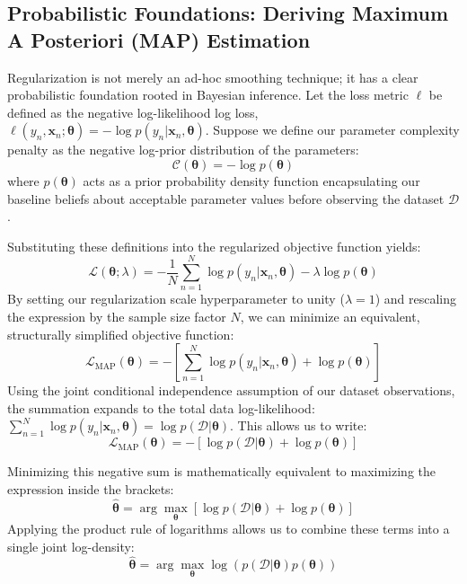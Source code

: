 \documentclass{article}
\begin{document}
\subsection{Probabilistic Foundations: Deriving Maximum A Posteriori (MAP) Estimation}

Regularization is not merely an ad-hoc smoothing technique; it has a clear probabilistic foundation rooted in Bayesian inference. Let the loss metric $\ell$ be defined as the negative log-likelihood log loss, $\ell(y_n, \mathbf{x}_n; \boldsymbol{\theta}) = -\log p(y_n | \mathbf{x}_n, \boldsymbol{\theta})$. Suppose we define our parameter complexity penalty as the negative log-prior distribution of the parameters:
\begin{equation}
\mathcal{C}(\boldsymbol{\theta}) = -\log p(\boldsymbol{\theta})
\end{equation}
where $p(\boldsymbol{\theta})$ acts as a prior probability density function encapsulating our baseline beliefs about acceptable parameter values before observing the dataset $\mathcal{D}$.

Substituting these definitions into the regularized objective function yields:
\begin{equation}
\mathcal{L}(\boldsymbol{\theta}; \lambda) = -\frac{1}{N} \sum_{n=1}^N \log p(y_n | \mathbf{x}_n, \boldsymbol{\theta}) - \lambda \log p(\boldsymbol{\theta})
\end{equation}
By setting our regularization scale hyperparameter to unity ($\lambda = 1$) and rescaling the expression by the sample size factor $N$, we can minimize an equivalent, structurally simplified objective function:
\begin{equation}
\mathcal{L}_{\text{MAP}}(\boldsymbol{\theta}) = -\left[ \sum_{n=1}^N \log p(y_n | \mathbf{x}_n, \boldsymbol{\theta}) + \log p(\boldsymbol{\theta}) \right]
\end{equation}
Using the joint conditional independence assumption of our dataset observations, the summation expands to the total data log-likelihood: $\sum_{n=1}^N \log p(y_n | \mathbf{x}_n, \boldsymbol{\theta}) = \log p(\mathcal{D} | \boldsymbol{\theta})$. This allows us to write:
\begin{equation}
\mathcal{L}_{\text{MAP}}(\boldsymbol{\theta}) = -\left[ \log p(\mathcal{D} | \boldsymbol{\theta}) + \log p(\boldsymbol{\theta}) \right]
\end{equation}

Minimizing this negative sum is mathematically equivalent to maximizing the expression inside the brackets:
\begin{equation}
\hat{\boldsymbol{\theta}} = \arg\max_{\boldsymbol{\theta}} \left[ \log p(\mathcal{D} | \boldsymbol{\theta}) + \log p(\boldsymbol{\theta}) \right]
\end{equation}
Applying the product rule of logarithms allows us to combine these terms into a single joint log-density:
\begin{equation}
\hat{\boldsymbol{\theta}} = \arg\max_{\boldsymbol{\theta}} \log \left( p(\mathcal{D} | \boldsymbol{\theta}) p(\boldsymbol{\theta}) \right)
\end{equation}
\end{document}
